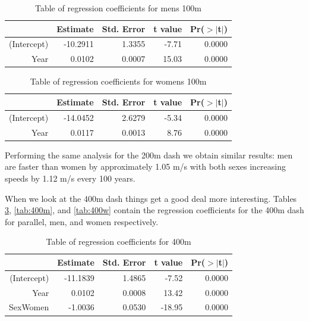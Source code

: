 \documentclass[11pt]{article}
\begin{document}
\begin{table}[ht]
\centering
\begin{tabular}{rrrrr}
  \hline
 & Estimate & Std. Error & t value & Pr($>$$|$t$|$) \\ 
  \hline
(Intercept) & -10.2911 & 1.3355 & -7.71 & 0.0000 \\ 
  Year & 0.0102 & 0.0007 & 15.03 & 0.0000 \\ 
   \hline
\end{tabular}
\caption{Table of regression coefficients for mens 100m}
\label{tab:regmen}
\end{table}

\begin{table}[ht]
\centering
\begin{tabular}{rrrrr}
  \hline
 & Estimate & Std. Error & t value & Pr($>$$|$t$|$) \\ 
  \hline
(Intercept) & -14.0452 & 2.6279 & -5.34 & 0.0000 \\ 
  Year & 0.0117 & 0.0013 & 8.76 & 0.0000 \\ 
   \hline
\end{tabular}
\caption{Table of regression coefficients for womens 100m}
\label{tab:regwom}
\end{table}

\pagebreak

Performing the same analysis for the 200m dash we obtain similar results: men are faster than women by approximately 1.05 m/s with both sexes increasing speeds by 1.12 m/s every 100 years.

When we look at the 400m dash things get a good deal more interesting. Tables \ref{tab:400b}, \ref{tab:400m}, and \ref{tab:400w} contain the regression coefficients for the 400m dash for parallel, men, and women respectively.

\begin{table}[ht]
\centering
\begin{tabular}{rrrrr}
  \hline
 & Estimate & Std. Error & t value & Pr($>$$|$t$|$) \\ 
  \hline
(Intercept) & -11.1839 & 1.4865 & -7.52 & 0.0000 \\ 
  Year & 0.0102 & 0.0008 & 13.42 & 0.0000 \\ 
  SexWomen & -1.0036 & 0.0530 & -18.95 & 0.0000 \\ 
   \hline
\end{tabular}
\caption{Table of regression coefficients for 400m}
\label{tab:400b}
\end{table}
\end{document}
